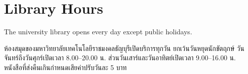 \documentclass[12pt]{article}
\begin{document}
\section*{Library Hours}
The university library opens every day except public holidays.

ห้องสมุดของมหาวิทยาลัยเทคโนโลยีราชมงคลธัญบุรีเปิดบริการทุกวัน ยกเว้นวันหยุดนักขัตฤกษ์
วันจันทร์ถึงวันศุกร์เปิดเวลา 8.00--20.00 น. ส่วนวันเสาร์และวันอาทิตย์เปิดเวลา 9.00--16.00 น.
หนังสือที่ส่งคืนเกินกำหนดเสียค่าปรับวันละ 5 บาท
\end{document}
